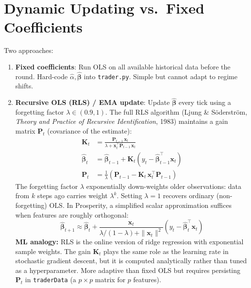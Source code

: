 \documentclass[12pt,a4paper,openany]{report}
\theoremstyle{definition}
\begin{document}
\section{Dynamic Updating vs.\ Fixed Coefficients}

Two approaches:

\begin{enumerate}[label=\arabic*.]
  \item \textbf{Fixed coefficients}: Run OLS on all available historical data before the round. Hard-code $\hat{\alpha}, \hat{\boldsymbol{\beta}}$ into \texttt{trader.py}. Simple but cannot adapt to regime shifts.
  \item \textbf{Recursive OLS (RLS) / EMA update}: Update $\hat{\boldsymbol{\beta}}$ every tick using a forgetting factor $\lambda \in (0.9, 1)$. The full RLS algorithm (Ljung \& S\"{o}derstr\"{o}m, \textit{Theory and Practice of Recursive Identification}, 1983) maintains a gain matrix $\mathbf{P}_t$ (covariance of the estimate):
  \begin{align}
    \mathbf{K}_t &= \frac{\mathbf{P}_{t-1}\,\mathbf{x}_t}{\lambda + \mathbf{x}_t^{\top}\mathbf{P}_{t-1}\,\mathbf{x}_t} \\[4pt]
    \hat{\boldsymbol{\beta}}_t &= \hat{\boldsymbol{\beta}}_{t-1} + \mathbf{K}_t\!\left(y_t - \hat{\boldsymbol{\beta}}_{t-1}^{\top}\mathbf{x}_t\right) \\[4pt]
    \mathbf{P}_t &= \frac{1}{\lambda}\!\left(\mathbf{P}_{t-1} - \mathbf{K}_t\,\mathbf{x}_t^{\top}\mathbf{P}_{t-1}\right)
  \end{align}
  The forgetting factor $\lambda$ exponentially down-weights older observations: data from $k$ steps ago carries weight $\lambda^k$. Setting $\lambda = 1$ recovers ordinary (non-forgetting) OLS. In Prosperity, a simplified scalar approximation suffices when features are roughly orthogonal:
  \[
    \hat{\boldsymbol{\beta}}_{t+1} \approx \hat{\boldsymbol{\beta}}_t + \frac{\mathbf{x}_t}{\lambda / (1-\lambda) + \|\mathbf{x}_t\|^2}\!\left(y_t - \hat{\boldsymbol{\beta}}_t^{\top}\mathbf{x}_t\right)
  \]
  \textbf{ML analogy:} RLS is the online version of ridge regression with exponential sample weights. The gain $\mathbf{K}_t$ plays the same role as the learning rate in stochastic gradient descent, but it is computed analytically rather than tuned as a hyperparameter. More adaptive than fixed OLS but requires persisting $\mathbf{P}_t$ in \texttt{traderData} (a $p \times p$ matrix for $p$ features).
\end{enumerate}
\end{document}

